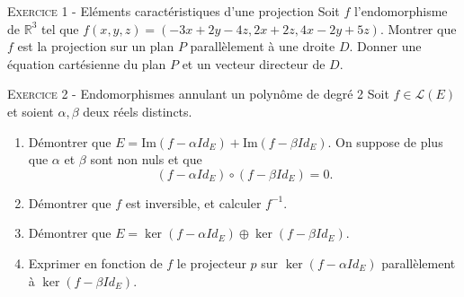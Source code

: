 \label{key}\documentclass[11pt]{article}
\begin{document}
 

\begin{center}\textsc{{\huge }}\end{center}



\vskip0.3cm\noindent\textsc{Exercice 1} - Eléments caractéristiques d'une projection
\vskip0.2cm
Soit $f$ l'endomorphisme de $\mathbb R^3$ tel que $f(x,y,z)=(-3x+2y-4z,2x+2z,4x-2y+5z)$. Montrer que $f$ est la projection sur un plan $P$ parallèlement à une droite $D$. Donner une équation cartésienne du plan $P$ et un vecteur directeur de $D$.




\vskip0.3cm\noindent\textsc{Exercice 2} - Endomorphismes annulant un polynôme de degré 2
\vskip0.2cm
Soit $f\in\mathcal L(E)$ et soient $\alpha,\beta$ deux réels distincts.
\begin{enumerate}
\item Démontrer que $E=\textrm{Im}(f-\alpha Id_E)+\textrm{Im}(f-\beta Id_E)$.\newline
On suppose de plus que $\alpha$ et $\beta$ sont non nuls et que $$(f-\alpha Id_E)\circ (f-\beta Id_E)=0.$$
\item Démontrer que $f$ est inversible, et calculer $f^{-1}$.
\item Démontrer que $E=\ker(f-\alpha Id_E)\oplus \ker(f-\beta Id_E)$.
\item Exprimer en fonction de $f$ le projecteur $p$ sur $\ker(f-\alpha Id_E)$ parallèlement
à $\ker(f-\beta Id_E)$.
\end{enumerate}


\end{document}
